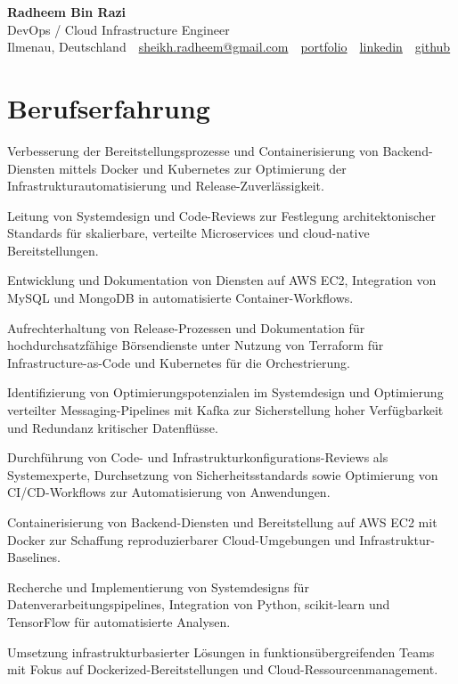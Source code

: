 \documentclass[11pt,a4paper]{resume}
\makeatletter
\newcommand{\Portfolio}{https://radheem.github.io/my-cv}
\newcommand{\PortfolioText}{portfolio}
\newcommand{\GitHub}{https://github.com/radheem}
\newcommand{\LinkedIn}{https://www.linkedin.com/in/radheem-razi}
\newcommand{\Email}{sheikh.radheem@gmail.com}
\makeatother
\begin{document}
\clearpage
{}

\begin{center}
  {\huge\bfseries Radheem Bin Razi}\\[3pt]
  {\large DevOps / Cloud Infrastructure Engineer}\\[6pt]
  \small
  Ilmenau, Deutschland \,\textbar\,
  \href{mailto:\Email}{\Email} \,\textbar\,
  \href{\Portfolio}{\PortfolioText} \,\textbar\,
  \href{\LinkedIn}{linkedin} \,\textbar\,
  \href{\GitHub}{github}
\end{center}
\vspace{2pt}

\section{Berufserfahrung}

\bullets
  \item Verbesserung der Bereitstellungsprozesse und Containerisierung von Backend-Diensten mittels Docker und Kubernetes zur Optimierung der Infrastrukturautomatisierung und Release-Zuverlässigkeit.
  \item Leitung von Systemdesign und Code-Reviews zur Festlegung architektonischer Standards für skalierbare, verteilte Microservices und cloud-native Bereitstellungen.
  \item Entwicklung und Dokumentation von Diensten auf AWS EC2, Integration von MySQL und MongoDB in automatisierte Container-Workflows.
\bulletsend
\vspace{3pt}
\bullets
  \item Aufrechterhaltung von Release-Prozessen und Dokumentation für hochdurchsatzfähige Börsendienste unter Nutzung von Terraform für Infrastructure-as-Code und Kubernetes für die Orchestrierung.
  \item Identifizierung von Optimierungspotenzialen im Systemdesign und Optimierung verteilter Messaging-Pipelines mit Kafka zur Sicherstellung hoher Verfügbarkeit und Redundanz kritischer Datenflüsse.
  \item Durchführung von Code- und Infrastrukturkonfigurations-Reviews als Systemexperte, Durchsetzung von Sicherheitsstandards sowie Optimierung von CI/CD-Workflows zur Automatisierung von Anwendungen.
\bulletsend
\vspace{3pt}
\bullets
  \item Containerisierung von Backend-Diensten und Bereitstellung auf AWS EC2 mit Docker zur Schaffung reproduzierbarer Cloud-Umgebungen und Infrastruktur-Baselines.
  \item Recherche und Implementierung von Systemdesigns für Datenverarbeitungspipelines, Integration von Python, scikit-learn und TensorFlow für automatisierte Analysen.
  \item Umsetzung infrastrukturbasierter Lösungen in funktionsübergreifenden Teams mit Fokus auf Dockerized-Bereitstellungen und Cloud-Ressourcenmanagement.
\bulletsend
\vspace{3pt}
\end{document}
